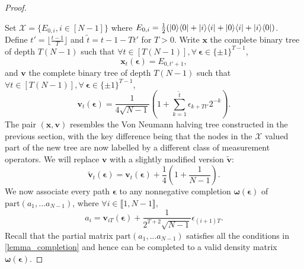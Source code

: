 \begin{proof}\label{proof:final}

Set $\mathcal{X} = \{E_{0,i}, i \in [N-1]\}$ where $E_{0,i}=\frac12(| 0 \rangle \langle 0 | + | i \rangle \langle i | + | 0 \rangle \langle i | + | i \rangle \langle 0 |)$. Define $t'=\lfloor \frac {t-1} T \rfloor$ and $\tilde t=t-1-Tt'$ for $T>0$. Write $\mathbf{x}$ the complete binary tree of depth $T(N-1)$ such that $\forall t\in[T(N-1)],\forall \ \boldsymbol{\epsilon} \in \{\pm 1\}^{T-1}$,
\begin{equation}
    \mathbf{x}_t (\boldsymbol{\epsilon}) = E_{0,t'+1}, 
\end{equation}
and $\mathbf{v}$ the complete binary tree of depth $T(N-1)$ such that $\forall t\in[T(N-1)],\forall \ \boldsymbol{\epsilon} \in \{\pm 1\}^{T-1}$,
\begin{equation}
    \mathbf{v}_t (\boldsymbol{\epsilon}) = \frac1{4\sqrt{N-1}}(1+\sum_{k=1}^{\tilde t}\epsilon_{k+Tt'}2^{-k}).
\end{equation}
The pair $(\mathbf{x}, \mathbf{v})$ resembles the Von Neumann halving tree constructed in the previous section, with the key difference being that the nodes in the $\mathcal{X}$ valued part of the new tree are now labelled by a different class of measurement operators. We will replace $\mathbf v$ with a slightly modified version $\tilde{\mathbf{v}}$:
\begin{equation}
    \tilde{\mathbf{v}}_t (\boldsymbol{\epsilon}) = \mathbf v_t(\boldsymbol{\epsilon})+\frac14(1+\frac1{N-1}).
\end{equation}
We now associate every path $\boldsymbol{\epsilon}$ to any nonnegative completion $\boldsymbol\omega(\boldsymbol\epsilon)$ of $\text{part}(a_1,...a_{N-1})$, where $\forall i\in\llbracket1,N-1\rrbracket$,
\begin{equation}
    a_i=\mathbf v_{iT}(\boldsymbol\epsilon)+\frac1{2^{T+2}\sqrt{N-1}}\epsilon_{(i+1)T}.
\end{equation}
Recall that the partial matrix $\text{part}(a_1,...a_{N-1})$ satisfies all the conditions in \cref{lemma_completion} and hence can be completed to a valid density matrix $\boldsymbol\omega(\boldsymbol\epsilon)$.



\end{proof}
